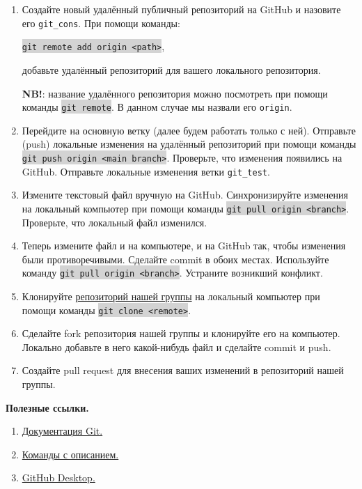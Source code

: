 \documentclass[10pt, a4paper]{extarticle}
\newcommand{\code}[1]{\colorbox{lightgray}{{\tt #1}}}
\begin{document}
	\begin{enumerate}
		\item Создайте новый удалённый публичный репозиторий на GitHub и назовите его {\tt git\_cons}. При помощи команды:
		
		\code{git remote add origin <path>},
	
		добавьте удалённый репозиторий для вашего локального репозитория.
		
		\textbf{NB!}: название удалённого репозитория можно посмотреть при помощи команды \code{git remote}. В данном случае мы назвали его {\tt origin}.
		
		\item Перейдите на основную ветку (далее будем работать только с ней). Отправьте (push) локальные изменения на удалённый репозиторий при помощи команды \code{git push origin <main branch>}. Проверьте, что изменения появились на GitHub. Отправьте локальные изменения ветки {\tt git\_test}.
		\item Измените текстовый файл вручную на GitHub. Синхронизируйте изменения на локальный компьютер при помощи команды \code{git pull origin <branch>}. Проверьте, что локальный файл изменился.
		\item Теперь измените файл и на компьютере, и на GitHub так, чтобы изменения были противоречивыми. Сделайте commit в обоих местах. Используйте команду \code{git pull origin <branch>}. Устраните возникший конфликт. 
		\item Клонируйте \href{https://github.com/V-Marco/hse_iad5_2021}{репозиторий нашей группы} на локальный компьютер при помощи команды \code{git clone <remote>}.
		\item Сделайте fork репозитория нашей группы и клонируйте его на компьютер. Локально добавьте в него какой-нибудь файл и сделайте commit и push. 
		\item Создайте pull request для внесения ваших изменений в репозиторий нашей группы. 
	\end{enumerate}

	\vspace{1em}
	
	{\Large \textbf{Полезные ссылки.}}
	
	\begin{enumerate}
		\item \href{https://git-scm.com/docs}{Документация Git.}
		\item \href{https://dzone.com/articles/top-20-git-commands-with-examples}{Команды с описанием.}
		\item \href{https://desktop.github.com}{GitHub Desktop.}
	\end{enumerate}
	
\end{document}
